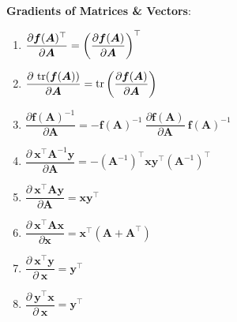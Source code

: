 \vspace{0.5cm}
\textbf{Gradients of Matrices \& Vectors}:

\begin{multicols}{2}
\begin{enumerate}[resume*=vcalrules]
    \item $
        \dfrac{\partial \bm{f}(\bm{A})^\top}{\partial \bm{A}}
        = \left(\dfrac{\partial \bm{f}(\bm{A})}{\partial \bm{A}}\right)^\top
    $
    \hfill \cite{mfml/book/mml/Deisenroth-Faisal-Ong}

    \item $
        \dfrac{\partial\ \tr(\bm{f}(\bm{A}))}{\partial \bm{A}}
        = \tr\dParenBrac{\dfrac{\partial \bm{f}(\bm{A})}{\partial \bm{A}}}
    $
    \hfill \cite{mfml/book/mml/Deisenroth-Faisal-Ong}

    \item
    $
        \dfrac{\partial \bm{f}(\bm{A})^{-1}}{\partial \bm{A}}
        = -\bm{f}(\bm{A})^{-1}\ \dfrac{\partial \bm{f}(\bm{A})}{\partial \bm{A}} \ \bm{f}(\bm{A})^{-1}
    $
    \hfill \cite{mfml/book/mml/Deisenroth-Faisal-Ong}

    \item
    $
        \dfrac{\partial\ \bm{x}^\top \bm{A}^{-1}\bm{y}}{\partial \bm{A}}
        = -(\bm{A}^{-1})^\top \bm{xy}^\top (\bm{A}^{-1})^\top
    $
    \hfill \cite{mfml/book/mml/Deisenroth-Faisal-Ong}

    \item
    $
        \dfrac{\partial\ \bm{x}^\top \bm{A}\bm{y}}{\partial \bm{A}}
        = \bm{xy}^\top
    $
    \hfill \cite{mfml/book/mml/Deisenroth-Faisal-Ong}

    \item
    $
        \dfrac{\partial\ \bm{x}^\top \bm{A}\bm{x}}{\partial \bm{x}}
        = \bm{x}^\top(\bm{A} + \bm{A}^\top)
    $
    \hfill \cite{mfml/book/mml/Deisenroth-Faisal-Ong}

    \item
    $
        \dfrac{\partial\ \bm{x}^\top \bm{y}}{\partial\ \bm{x}} = \bm{y}^\top
    $
    \hfill \cite{mfml/book/mml/Deisenroth-Faisal-Ong}

    \item
    $
        \dfrac{\partial\ \bm{y}^\top \bm{x}}{\partial\ \bm{x}} = \bm{y}^\top
    $
    \hfill \cite{mfml/book/mml/Deisenroth-Faisal-Ong}
\end{enumerate}
\end{multicols}


